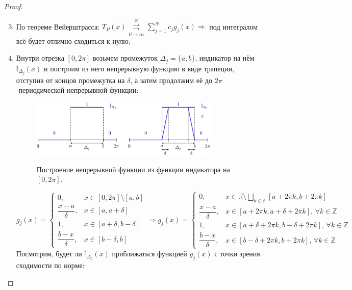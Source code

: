 \documentclass[12pt]{article}
\newcommand{\MR}{\mathbb{R}}
\newcommand{\MZ}{\mathbb{Z}}
\newcommand{\MTI}{\mathbb{I}}
\theoremstyle{definition}
\newcommand{\ddsum}[2]{\displaystyle\sum\limits_{#1}^{#2}}
\newcommand{\uconvm}[2]{\overset{#1}{\underset{#2}{\rightrightarrows}}}
\begin{document}
\begin{proof}
	\begin{enumerate}[label=\arabic*)]
		\setcounter{enumi}{2}
		\item По теореме Вейерштрасса: $T_P(x) \uconvm{\MR}{P \to \infty} \ddsum{j = 1}{N}c_jg_j(x) \Rightarrow$ под интегралом всё будет отлично сходиться к нулю;
		\setcounter{enumi}{1}
		\item Внутри отрезка $[0,2\pi]$ возьмем промежуток $\Delta_j = \{a,b\}$, индикатор на нём $\MTI_{\Delta_j}(x)$ и построим из него непрерывную функцию в виде трапеции, отступив от концов промежутка на $\delta$, а 	затем продолжим её до $2\pi$-периодической непрерывной функции:
		\begin{figure}[H]
			\centering
			\includegraphics[width=0.85\textwidth]{MA3L27_4.eps}
			\label{MA3L27_4}
			\caption{Построение непрерывной функции из функции индикатора на $[0,2\pi]$.}
			\label{fig: Построение функции}
		\end{figure}
		$$
			g_j(x) = 
			\left\{
			\begin{array}{rl}
				0, & x \in [0,2\pi] \setminus \left[a , b \right] \\[10pt]
				\dfrac{x - a}{\delta}, & x \in  \left[a , a + \delta \right]\\[10pt]
				1, & x \in  \left[a + \delta, b - \delta \right]\\[10pt]
				\dfrac{b - x}{\delta}, & x \in  \left[b - \delta , b  \right]
			\end{array}
			\right. \Rightarrow 			g_j(x) = 
			\left\{
			\begin{array}{rl}
				0, & x \in \MR \setminus \displaystyle \bigsqcup\limits_{k \in \MZ}\left[a + 2\pi k, b + 2\pi k\right] \\[10pt]
				\dfrac{x - a}{\delta}, & x \in  \left[a + 2\pi k, a + \delta + 2\pi k\right], \, \forall k \in \MZ \\[10pt]
				1, & x \in  \left[a + \delta + 2\pi k, b - \delta + 2\pi k\right], \, \forall k \in \MZ \\[10pt]
				\dfrac{b - x}{\delta}, & x \in  \left[b - \delta + 2\pi k, b +  2\pi k\right], \, \forall k \in \MZ
			\end{array}
			\right.
		$$
		Посмотрим, будет ли $\MTI_{\Delta_j}(x)$ приближаться функцией $g_j(x)$ с точки зрения сходимости по норме:

\end{enumerate}
\end{proof}
\end{document}
